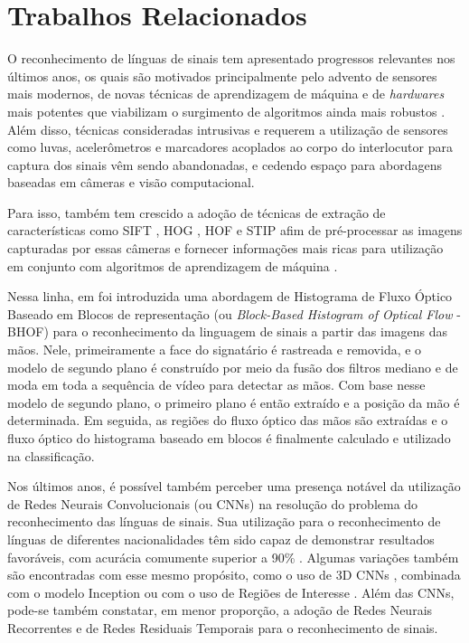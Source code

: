 \section{Trabalhos Relacionados} %
\label{sec:trabalhos-relacionados}

O reconhecimento de línguas de sinais tem apresentado progressos relevantes nos últimos anos, os quais são motivados principalmente pelo advento de sensores mais modernos, de novas técnicas de aprendizagem de máquina e de \textit{hardwares} mais potentes que viabilizam o surgimento de algoritmos ainda mais robustos \cite{recent-advances-dl-2017, recent-advances-sl-2013}. Além disso, técnicas consideradas intrusivas e requerem a utilização de sensores como luvas, acelerômetros e marcadores acoplados ao corpo do interlocutor para captura dos sinais vêm sendo abandonadas, e cedendo espaço para abordagens baseadas em câmeras e visão computacional.

Para isso, também tem crescido a adoção de técnicas de extração de características como SIFT \cite{sift-2004}, HOG \cite{hog-2005}, HOF \cite{hof-2008} e STIP \cite{hof-2008} \cite{recent-advances-dl-2017} afim de pré-processar as imagens capturadas por essas câmeras e fornecer informações mais ricas para utilização em conjunto com algoritmos de aprendizagem de máquina \cite{lim-2016, shanta-2018}.

Nessa linha, em \cite{lim-2016} foi introduzida uma abordagem de Histograma de Fluxo Óptico Baseado em Blocos de representação (ou \textit{Block-Based Histogram of Optical Flow} - BHOF) para o reconhecimento da linguagem de sinais a partir das imagens das mãos. Nele, primeiramente a face do signatário é rastreada e removida, e o modelo de segundo plano é construído por meio da fusão dos filtros mediano e de moda em toda a sequência de vídeo para detectar as mãos. Com base nesse modelo de segundo plano, o primeiro plano é então extraído e a posição da mão é determinada. Em seguida, as regiões do fluxo óptico das mãos são extraídas e o fluxo óptico do histograma baseado em blocos é finalmente calculado e utilizado na classificação. 

Nos últimos anos, é possível também perceber uma presença notável da utilização de Redes Neurais Convolucionais (ou CNNs) na resolução do problema do reconhecimento das línguas de sinais. Sua utilização para o reconhecimento de línguas de diferentes nacionalidades têm sido capaz de demonstrar resultados favoráveis, com acurácia comumente superior a 90\%  \cite{shanta-2018, ji-2017, taskiran-2018, rao-2018}. Algumas variações também são encontradas com esse mesmo propósito, como o uso de 3D CNNs \cite{elbadawy-2017}, combinada com o modelo Inception \cite{das-2018} ou com o uso de Regiões de Interesse \cite{sajanraj-2018}. Além das CNNs, pode-se também constatar, em menor proporção, a adoção de Redes Neurais Recorrentes \cite{konstantinidis-2018} e de Redes Residuais Temporais \cite{pigou-2017} para o reconhecimento de sinais.

